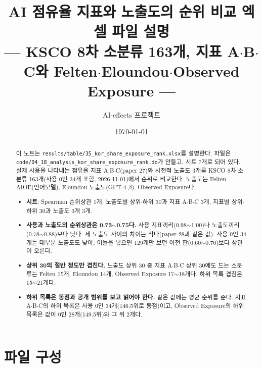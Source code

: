 \documentclass[11pt]{article}
\title{AI 점유율 지표와 노출도의 순위 비교 엑셀 파일 설명\\[2mm]
\large --- KSCO 8차 소분류 163개, 지표 A$\cdot$B$\cdot$C와 Felten$\cdot$Eloundou$\cdot$Observed Exposure ---}
\author{AI-effects 프로젝트}
\date{\today}
\begin{document}
\maketitle

\begin{abstract}
\noindent 이 노트는 \texttt{results/table/35\_kor\_share\_exposure\_rank.xlsx}를 설명한다. 파일은 \texttt{code/04\_18\_analysis\_kor\_share\_exposure\_rank.do}가 만들고, 시트 7개로 되어 있다. 실제 사용을 나타내는 점유율 지표 A$\cdot$B$\cdot$C(paper 27)와 사전적 노출도 3개를 KSCO 8차 소분류 163개(사용 0인 34개 포함, 2026-11-01)에서 순위로 비교한다. 노출도는 Felten AIOE(언어모델)\parencite{felten-2021-occupational-industry-and-geographic-exposure,felten-2023-how-will-language-modelers-like-chatgpt}, Eloundou 노출도(GPT-4 $\beta$)\parencite{eloundou-2023-gpts-are-gpts-an-early}, Observed Exposure\parencite{massenkoff-2026-labor-market-impacts-of-ai}다.
\begin{itemize}[leftmargin=*]
  \item \textbf{시트}: Spearman 순위상관 1개, 노출도별 상위$\cdot$하위 30과 지표 A$\cdot$B$\cdot$C 3개, 지표별 상위$\cdot$하위 30과 노출도 3개 3개.
  \item \textbf{사용과 노출도의 순위상관은 0.73$\sim$0.75다.} 사용 지표끼리(0.98$\sim$1.00)나 노출도끼리(0.78$\sim$0.88)보다 낮다. 세 노출도 사이의 차이는 작다(paper 28과 같은 값). 사용 0인 34개는 대부분 노출도도 낮아, 이들을 넣으면 129개만 보던 이전 판(0.60$\sim$0.70)보다 상관이 오른다.
  \item \textbf{상위 30의 절반 정도만 겹친다.} 노출도 상위 30 중 지표 A$\cdot$B$\cdot$C 상위 30에도 드는 소분류는 Felten 15개, Eloundou 14개, Observed Exposure 17$\sim$18개다. 하위 목록 겹침은 15$\sim$21개다.
  \item \textbf{하위 목록은 동점과 공개 범위를 보고 읽어야 한다.} 같은 값에는 평균 순위를 준다. 지표 A$\cdot$B$\cdot$C의 하위 목록은 사용 0인 34개(146.5위로 동점)이고, Observed Exposure의 하위 목록은 값이 0인 28개(149.5위)와 그 위 2개다.
\end{itemize}
\end{abstract}

\section{파일 구성}
\end{document}

